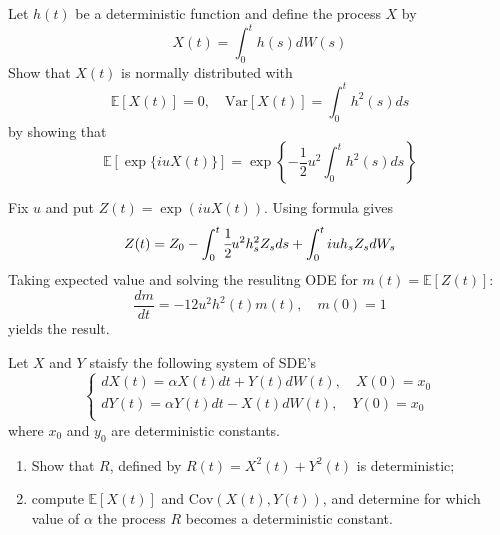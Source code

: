 \documentclass[12pt,a4paper]{exam}
\begin{document}
\begin{questions}
\begin{solution}
\begin{solution}
\question Let $h(t)$ be a deterministic function and define the process $X$ by
\begin{equation*}
X(t) = \int_0^t h(s) dW(s)
\end{equation*}
Show that $X(t)$ is normally distributed with 
\begin{equation*}
\mathbb{E}[X(t)] = 0, \quad \text{Var}[X(t)] = \int_0^t h^2(s) ds
\end{equation*}
by showing that 
\begin{equation*}
\mathbb{E}[\exp\{i u X(t)\}] = \exp\left\{-\frac{1}{2}u^2 \int_0^t h^2(s) ds\right\}
\end{equation*}
\fillwithlines{3cm}

\begin{solution}
Fix $u$ and put $Z(t)=\exp (iuX(t))$. Using \ito formula gives
\begin{equation*}
Z(t) = Z_0 - \int_0^t \cfrac{1}{2}u^2h_s^2Z_s ds + \int_0^t iuh_sZ_sdW_s
\end{equation*}
Taking expected value and solving the resulitng ODE for $m(t)=\mathbb{E}[Z(t)]$:
\begin{equation*}
\frac{dm}{dt} = -{1}{2}u^2h^2(t)m(t), \quad m(0)=1
\end{equation*}
yields the result.
\end{solution}

\question Let $X$ and $Y$ staisfy the following system of SDE's
\begin{equation*}
\begin{cases}
dX(t) = \alpha X(t) dt + Y(t)dW(t), \quad X(0) = x_0\\
dY(t) = \alpha Y(t) dt - X(t)dW(t), \quad Y(0) = x_0\\
\end{cases}
\end{equation*}
where $x_0$ and $y_0$ are deterministic constants.
\begin{enumerate}[label=(\alph*),font=\itshape]
\item Show that $R$, defined by $R(t) = X^2(t)+Y^2(t)$ is deterministic;
\item compute $\mathbb{E}[X(t)]$ and $\text{Cov}(X(t), Y(t))$, and determine for which value of $\alpha$ the process $R$ becomes a deterministic constant.
\end{enumerate}
\fillwithlines{3cm}


\end{solution}
\end{solution}
\end{questions}
\end{document}
